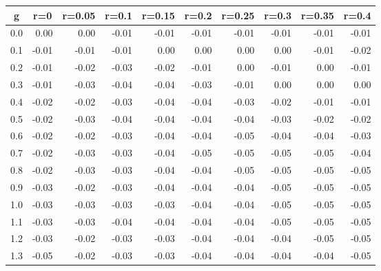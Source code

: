 %
\begin{table}[!tbp]
 \begin{center}
 \begin{tabular}{rrrrrrrrrr}\hline\hline
\multicolumn{1}{c}{g}&\multicolumn{1}{c}{r=0}&\multicolumn{1}{c}{r=0.05}&\multicolumn{1}{c}{r=0.1}&\multicolumn{1}{c}{r=0.15}&\multicolumn{1}{c}{r=0.2}&\multicolumn{1}{c}{r=0.25}&\multicolumn{1}{c}{r=0.3}&\multicolumn{1}{c}{r=0.35}&\multicolumn{1}{c}{r=0.4}\tabularnewline
\hline
0.0& 0.00& 0.00&-0.01&-0.01&-0.01&-0.01&-0.01&-0.01&-0.01\tabularnewline
0.1&-0.01&-0.01&-0.01& 0.00& 0.00& 0.00& 0.00&-0.01&-0.02\tabularnewline
0.2&-0.01&-0.02&-0.03&-0.02&-0.01& 0.00&-0.01& 0.00&-0.01\tabularnewline
0.3&-0.01&-0.03&-0.04&-0.04&-0.03&-0.01& 0.00& 0.00& 0.00\tabularnewline
0.4&-0.02&-0.02&-0.03&-0.04&-0.04&-0.03&-0.02&-0.01&-0.01\tabularnewline
0.5&-0.02&-0.03&-0.04&-0.04&-0.04&-0.04&-0.03&-0.02&-0.02\tabularnewline
0.6&-0.02&-0.02&-0.03&-0.04&-0.04&-0.05&-0.04&-0.04&-0.03\tabularnewline
0.7&-0.02&-0.03&-0.03&-0.04&-0.05&-0.05&-0.05&-0.05&-0.04\tabularnewline
0.8&-0.02&-0.03&-0.03&-0.04&-0.04&-0.05&-0.05&-0.05&-0.05\tabularnewline
0.9&-0.03&-0.02&-0.03&-0.04&-0.04&-0.04&-0.05&-0.05&-0.05\tabularnewline
1.0&-0.03&-0.03&-0.03&-0.03&-0.04&-0.04&-0.05&-0.05&-0.05\tabularnewline
1.1&-0.03&-0.03&-0.04&-0.04&-0.04&-0.04&-0.05&-0.05&-0.05\tabularnewline
1.2&-0.03&-0.02&-0.03&-0.03&-0.04&-0.04&-0.04&-0.05&-0.05\tabularnewline
1.3&-0.05&-0.02&-0.03&-0.03&-0.04&-0.04&-0.04&-0.04&-0.05\tabularnewline
\hline
\end{tabular}

\end{center}

\end{table}

